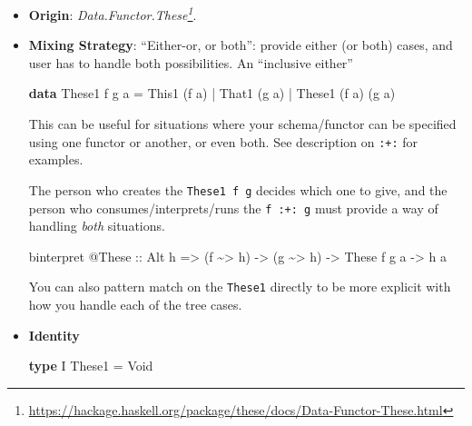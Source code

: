 \documentclass[]{article}
\newenvironment{Shaded}{}{}
\newcommand{\DataTypeTok}[1]{\textcolor[rgb]{0.56,0.13,0.00}{#1}}
\newcommand{\KeywordTok}[1]{\textcolor[rgb]{0.00,0.44,0.13}{\textbf{#1}}}
\newcommand{\NormalTok}[1]{#1}
\newcommand{\OperatorTok}[1]{\textcolor[rgb]{0.40,0.40,0.40}{#1}}
\newcommand{\OtherTok}[1]{\textcolor[rgb]{0.00,0.44,0.13}{#1}}
\renewcommand{\href}[2]{#2\footnote{\url{#1}}}
\begin{document}
\begin{itemize}
\item
  \textbf{Origin}:
  \emph{\href{https://hackage.haskell.org/package/these/docs/Data-Functor-These.html}{Data.Functor.These}}.
\item
  \textbf{Mixing Strategy}: ``Either-or, or both'': provide either (or both)
  cases, and user has to handle both possibilities. An ``inclusive either''

\begin{Shaded}
\begin{Highlighting}[]
\KeywordTok{data} \DataTypeTok{These1}\NormalTok{ f g a}
    \OtherTok{=} \DataTypeTok{This1}\NormalTok{  (f a)}
    \OperatorTok{|} \DataTypeTok{That1}\NormalTok{        (g a)}
    \OperatorTok{|} \DataTypeTok{These1}\NormalTok{ (f a) (g a)}
\end{Highlighting}
\end{Shaded}

  This can be useful for situations where your schema/functor can be specified
  using one functor or another, or even both. See description on \texttt{:+:}
  for examples.

  The person who creates the \texttt{These1\ f\ g} decides which one to give,
  and the person who consumes/interprets/runs the \texttt{f\ :+:\ g} must
  provide a way of handling \emph{both} situations.

\begin{Shaded}
\begin{Highlighting}[]
\NormalTok{binterpret }\OperatorTok{@}\DataTypeTok{These}
\OtherTok{    ::} \DataTypeTok{Alt}\NormalTok{ h}
    \OtherTok{=>}\NormalTok{ (f }\OperatorTok{\textasciitilde{}>}\NormalTok{ h)}
    \OtherTok{{-}>}\NormalTok{ (g }\OperatorTok{\textasciitilde{}>}\NormalTok{ h)}
    \OtherTok{{-}>} \DataTypeTok{These}\NormalTok{ f g a}
    \OtherTok{{-}>}\NormalTok{ h a}
\end{Highlighting}
\end{Shaded}

  You can also pattern match on the \texttt{These1} directly to be more explicit
  with how you handle each of the tree cases.
\item
  \textbf{Identity}

\begin{Shaded}
\begin{Highlighting}[]
\KeywordTok{type} \DataTypeTok{I} \DataTypeTok{These1} \OtherTok{=} \DataTypeTok{Void}
\end{Highlighting}
\end{Shaded}


\end{itemize}
\end{document}
